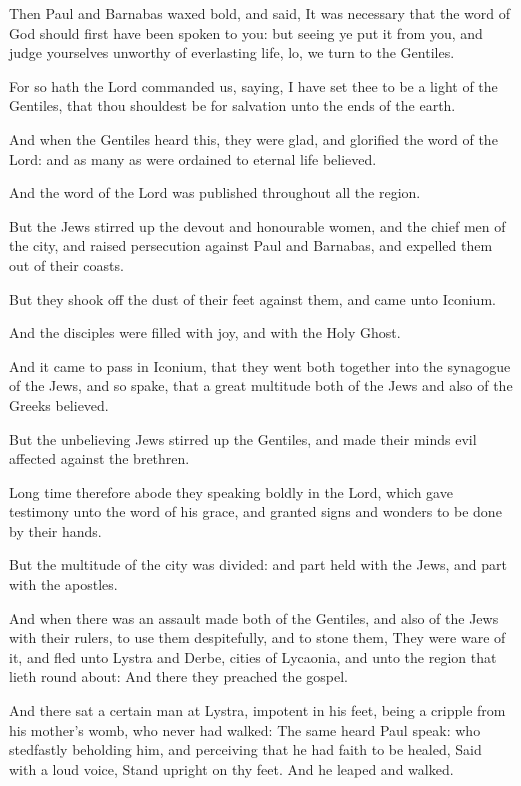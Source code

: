 \Verse Then Paul and Barnabas waxed bold, and said, It was necessary that the word of God should first have been spoken to you: but seeing ye put it from you, and judge yourselves unworthy of everlasting life, lo, we turn to the Gentiles.

\Verse For so hath the Lord commanded us, saying, I have set thee to be a light of the Gentiles, that thou shouldest be for salvation unto the ends of the earth.

\Verse And when the Gentiles heard this, they were glad, and glorified the word of the Lord: and as many as were ordained to eternal life believed.

\Verse And the word of the Lord was published throughout all the region.

\Verse But the Jews stirred up the devout and honourable women, and the chief men of the city, and raised persecution against Paul and Barnabas, and expelled them out of their coasts.

\Verse But they shook off the dust of their feet against them, and came unto Iconium.

\Verse And the disciples were filled with joy, and with the Holy Ghost.


\Chapter
\Verse And it came to pass in Iconium, that they went both together into the synagogue of the Jews, and so spake, that a great multitude both of the Jews and also of the Greeks believed.

\Verse But the unbelieving Jews stirred up the Gentiles, and made their minds evil affected against the brethren.

\Verse Long time therefore abode they speaking boldly in the Lord, which gave testimony unto the word of his grace, and granted signs and wonders to be done by their hands.

\Verse But the multitude of the city was divided: and part held with the Jews, and part with the apostles.

\Verse And when there was an assault made both of the Gentiles, and also of the Jews with their rulers, to use them despitefully, and to stone them, \Verse They were ware of it, and fled unto Lystra and Derbe, cities of Lycaonia, and unto the region that lieth round about: \Verse And there they preached the gospel.

\Verse And there sat a certain man at Lystra, impotent in his feet, being a cripple from his mother's womb, who never had walked: \Verse The same heard Paul speak: who stedfastly beholding him, and perceiving that he had faith to be healed, \Verse Said with a loud voice, Stand upright on thy feet. And he leaped and walked.


